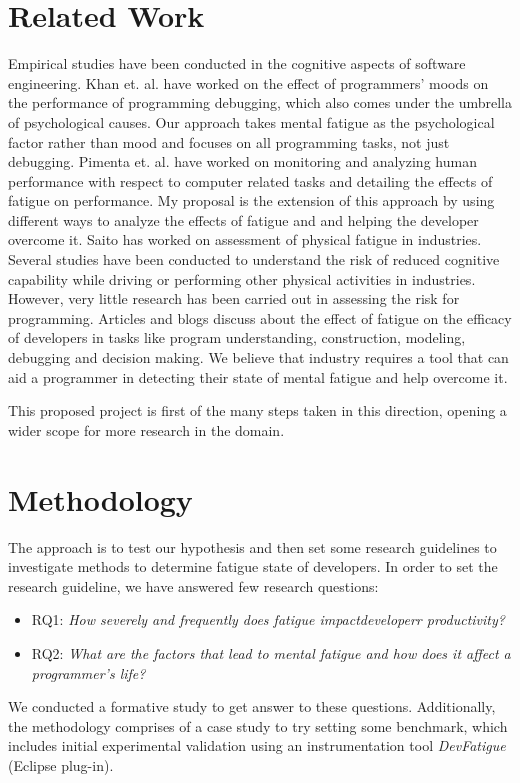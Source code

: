 \documentclass{acm_proc_article-sp}
\begin{document}
\section{Related Work}
Empirical studies have been conducted in the cognitive aspects 
of software engineering. Khan et. al. \cite{khan:mood} have worked on the effect 
of programmers' moods on the performance of programming debugging, 
which also comes under the umbrella of psychological causes. 
Our approach takes mental fatigue as the psychological factor 
rather than mood and focuses on all programming tasks, not just debugging.
Pimenta et. al. \cite{pimenta:monitor} \cite{pimenta:analysis} have worked on
monitoring and analyzing human performance with respect to computer related
tasks and detailing the effects of fatigue on performance. My proposal is the
extension of this approach by using different ways to analyze the effects of
fatigue and and helping the developer overcome it. Saito \cite{saito:industry}
has worked on assessment of physical fatigue in industries. Several studies have
been conducted to understand the risk of reduced cognitive capability while
driving or performing other physical activities in industries. However, very
little research has been carried out in assessing the risk for programming.
Articles \cite{website:blog-decision} and blogs \cite{website:blog-fatigue}
discuss about the effect of fatigue on the efficacy of developers in tasks like
program understanding, construction, modeling, debugging and decision making.
We believe that industry requires a tool that can aid a programmer in detecting
their state of mental fatigue and help overcome it.

This proposed project is first of the many steps taken in this 
direction, opening a wider scope for more research in the domain.

\section{Methodology}
The approach is to test our hypothesis and then set some research
guidelines to investigate methods to determine fatigue state of developers. In
order to set the research guideline, we have answered few research questions:
\begin{itemize}
  \item RQ1: \textit{How severely and frequently does fatigue impactdeveloperr
  productivity?}
  \item RQ2: \textit{What are the factors that lead to mental fatigue and
  how does it affect a programmer's life?}
\end{itemize}
We conducted a formative study to get answer to these questions.
Additionally, the methodology comprises of a case study to try setting some
benchmark, which includes initial experimental validation using an
instrumentation tool \textit{DevFatigue} (Eclipse plug-in).\\
\end{document}
